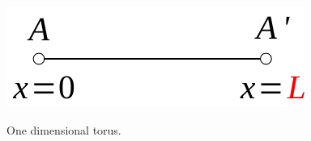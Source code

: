\documentclass[../main.tex]{subfiles}
\begin{document}
\begin{marginfigure}[-25mm]
	\includegraphics[width=1\linewidth]{images/1dim_Tor.pdf}
	\caption{One dimensional torus.}
\end{marginfigure}
\end{document}
